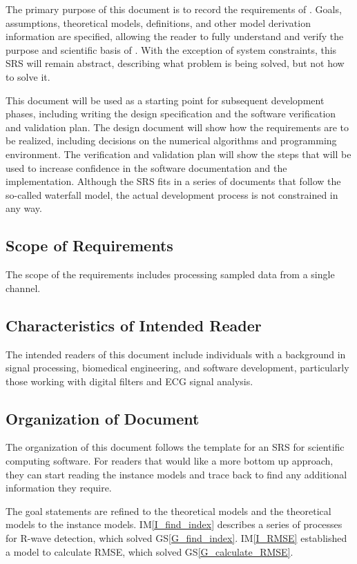\documentclass[12pt]{article}
\newcommand{\gsref}[1]{GS\ref{#1}} \newcounter{instnum} %
\newcommand{\iref}[1]{IM\ref{#1}} \newcounter{reqnum} %
\begin{document}
The primary purpose of this document is to record the requirements of \progname.
Goals, assumptions, theoretical models, definitions, and other model derivation
information are specified, allowing the reader to fully understand and verify
the purpose and scientific basis of \progname.  With the exception of system
constraints, this SRS will remain abstract, describing what problem is being
solved, but not how to solve it.

This document will be used as a starting point for subsequent development
phases, including writing the design specification and the software verification
and validation plan.  The design document will show how the requirements are to
be realized, including decisions on the numerical algorithms and programming
environment.  The verification and validation plan will show the steps that will
be used to increase confidence in the software documentation and the
implementation.  Although the SRS fits in a series of documents that follow the
so-called waterfall model, the actual development process is not constrained in
any way.

\subsection{Scope of Requirements} 

The scope of the requirements includes processing sampled data from a single
channel.

\subsection{Characteristics of Intended Reader} \label{sec_IntendedReader}

The intended readers of this document include individuals with a background in
signal processing, biomedical engineering, and software development,
particularly those working with digital filters and ECG signal analysis.

\subsection{Organization of Document}

The organization of this document follows the template for an SRS for scientific
computing software. For readers that would like a more bottom up approach, they
can start reading the instance models and trace back to find any additional
information they require.

The goal statements are refined to the theoretical models and the theoretical
models to the instance models.  \iref{I_find_index} describes a series of
processes for R-wave detection, which solved \gsref{G_find_index}.
\iref{I_RMSE} established a model to calculate RMSE, which solved
\gsref{G_calculate_RMSE}.
\end{document}
